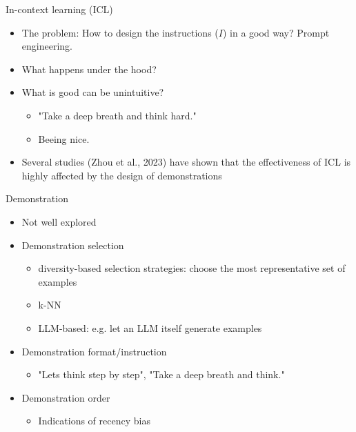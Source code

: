 \documentclass[10pt]{beamer}
\begin{document}
\begin{frame}{In-context learning (ICL)}

\begin{itemize}
\item The problem: How to design the instructions ($I$) in a good way? Prompt engineering.
\pause
\item What happens under the hood? 
\item What is good can be unintuitive?
\begin{itemize}
\item "Take a deep breath and think hard." %
\item Beeing nice. %
\end{itemize}
\pause
\item Several studies (Zhou et al., 2023) have shown that the effectiveness of ICL is highly affected by the design of demonstrations %
\end{itemize}

\end{frame}


\begin{frame}{Demonstration}

\begin{itemize}
\item Not well explored
\item Demonstration selection
\begin{itemize}
\item diversity-based selection strategies: choose the most representative set of examples
\item k-NN
\item LLM-based: e.g. let an LLM itself generate examples
\end{itemize}
\item Demonstration format/instruction
\begin{itemize}
\item "Lets think step by step", "Take a deep breath and think."
\end{itemize}
\item Demonstration order
\begin{itemize}
\item Indications of recency bias
\end{itemize}
\end{itemize}


\end{frame}
\end{document}
